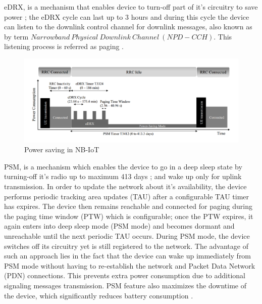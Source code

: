 \documentclass[12pt]{article}
\begin{document}
eDRX, is a mechanism that enables device to turn-off part of it's circuitry to save power \cite{el2018evaluating}; the eDRX cycle can last up to 3 hours \cite{farrell2018low} and during this cycle the device can listen to the downlink control channel for downlink messages, also known as by term  $Narrowband\  Physical\  Downlink\  Channel\  (NPD-CCH)$. This listening process is referred as paging \cite{sultania2019implementation}.\par 

\begin{figure}[H]
    \centering
    \includegraphics[width=0.9\columnwidth]{Images/nbiotDRXcycle.pdf}
    \caption{Power saving in NB-IoT \cite{sultania2019implementation} }
    \label{fig:Power saving in NB-IoT}
\end{figure}

PSM, is a mechanism which enables the device to go in a deep sleep state by turning-off it's radio up to maximum 413 days \cite{sultania2019implementation}; and wake up only for uplink transmission. In order to update the network about it's availability, the device performs periodic tracking area updates (TAU) after a configurable TAU timer has expires. The device then remains reachable and connected for paging during the paging time window (PTW) which is configurable; once the PTW expires, it again enters into  deep sleep mode (PSM mode) and becomes dormant and unreachable until the next periodic TAU occurs. During PSM mode, the device switches off its circuitry yet is still registered to the network. The advantage of such an approach lies in the fact that the device can wake up immediately from PSM mode without having to re-establish the network and Packet Data Network (PDN) connections. This prevents extra power consumption due to additional signaling messages transmission. PSM feature also maximizes the downtime of the device, which significantly reduces battery consumption \cite{rohdepowernbiot}.\par
\end{document}
